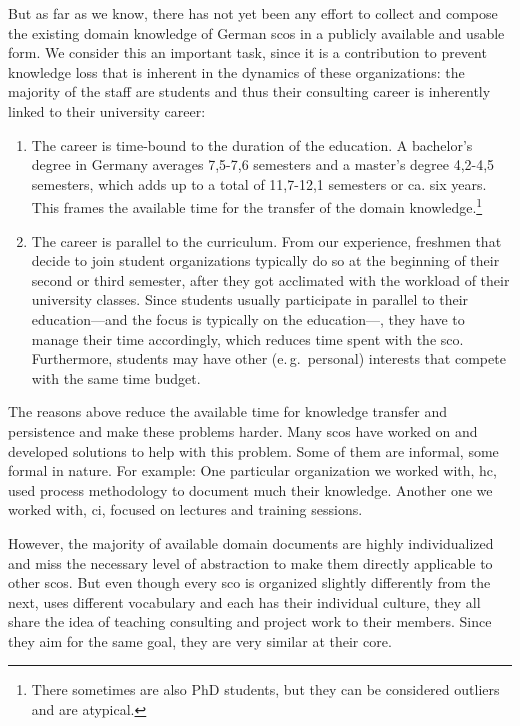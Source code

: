 \documentclass[a4paper, DIV=13, BCOR=0cm]{scrbook}
\newcommand{\eg}{e.\,g.\ }
\begin{document}
But as far as we know, there has not yet been any effort to collect and compose the existing domain knowledge of German \glspl{sco} in a publicly available and usable form. We consider this an important task, since it is a contribution to prevent knowledge loss that is inherent in the dynamics of these organizations: the majority of the staff are students and thus their consulting career is inherently linked to their university career:

\begin{enumerate}
	\item The career is time-bound to the duration of the education. A bachelor's degree in Germany averages 7,5-7,6 semesters and a master's degree 4,2-4,5 semesters, which adds up to a total of 11,7-12,1 semesters or ca. six years. \cite{stabu2019a} This frames the available time for the transfer of the domain knowledge.\footnote{There sometimes are also PhD students, but they can be considered outliers and are atypical.}
	\item The career is parallel to the curriculum. From our experience, freshmen that decide to join student organizations typically do so at the beginning of their second or third semester, after they got acclimated with the workload of their university classes. Since students usually participate in parallel to their education---and the focus is typically on the education---, they have to manage their time accordingly, which reduces time spent with the \gls{sco}. Furthermore, students may have other (\eg personal) interests that compete with the same time budget.
\end{enumerate}

The reasons above reduce the available time for knowledge transfer and persistence and make these problems harder. Many \glspl{sco} have worked on and developed solutions to help with this problem. Some of them are informal, some formal in nature. For example: One particular organization we worked with, \gls{hc}, used process methodology to document much their knowledge. Another one we worked with, \gls{ci}, focused on lectures and training sessions.

However, the majority of available domain documents are highly individualized and miss the necessary level of abstraction to make them directly applicable to other \glspl{sco}. But even though every \gls{sco} is organized slightly differently from the next, uses different vocabulary and each has their individual culture, they all share the idea of teaching consulting and project work to their members. Since they aim for the same goal, they are very similar at their core.
\end{document}
